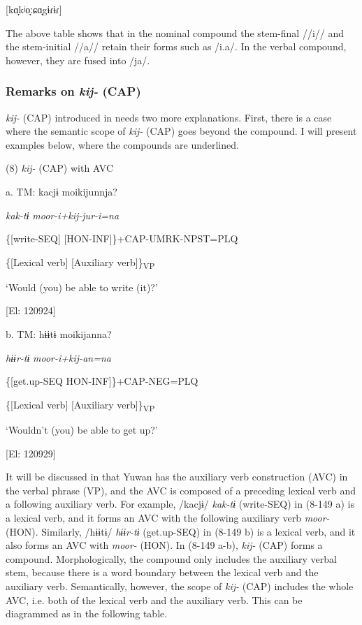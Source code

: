 [kɑ̞kʲo̞ːɕɑ̞gɨɾɨɾ]

The above table shows that in the nominal compound the stem-final //i// and the stem-initial //a// retain their forms such as /i.a/. In the verbal compound, however, they are fused into /ja/.

\subsubsection{Remarks on \textit{kij-} (CAP)}

\textit{kij-} (CAP) introduced in  needs two more explanations. First, there is a case where the semantic scope of \textit{kij-} (CAP) goes beyond the compound. I will present examples below, where the compounds are underlined.

(8)  \textit{kij-} (CAP) with AVC

  a.  TM:  kacjɨ  moikijunnja?

      \textit{kak-tɨ}  \textit{moor-i+kij{}-jur-i=na}

      \{[write-SEQ]  [HON-INF]\}+CAP-UMRK-NPST=PLQ

      \{[Lexical verb]  [Auxiliary verb]\}\textsubscript{VP}

      ‘Would (you) be able to write (it)?’

      [El: 120924]

  b.  TM:  hɨɨtɨ  moikijanna?

      \textit{hɨɨr-tɨ}  \textit{moor-i+kij{}-an=na}

      \{[get.up-SEQ  HON-INF]\}+CAP-NEG=PLQ

      \{[Lexical verb]  [Auxiliary verb]\}\textsubscript{VP}

      ‘Wouldn’t (you) be able to get up?’

      [El: 120929]

It will be discussed in  that Yuwan has the auxiliary verb construction (AVC) in the verbal phrase (VP), and the AVC is composed of a preceding lexical verb and a following auxiliary verb. For example, /kacjɨ/ \textit{kak-tɨ} (write-SEQ) in (8-149 a) is a lexical verb, and it forms an AVC with the following auxiliary verb \textit{moor-} (HON). Similarly, /hɨɨtɨ/ \textit{hɨɨr-tɨ} (get.up-SEQ) in (8-149 b) is a lexical verb, and it also forms an AVC with \textit{moor-} (HON). In (8-149 a-b), \textit{kij-} (CAP) forms a compound. Morphologically, the compound only includes the auxiliary verbal stem, because there is a word boundary between the lexical verb and the auxiliary verb. Semantically, however, the scope of \textit{kij-} (CAP) includes the whole AVC, i.e. both of the lexical verb and the auxiliary verb. This can be diagrammed as in the following table.

